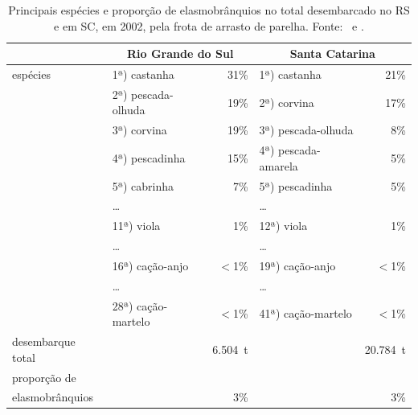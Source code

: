 \documentclass[a4paper,11pt,twoside,showtrims,onecolumn,openright,final]{memoir}
\begin{document}
\begin{table}
\caption[Principais espécies e proporção de elasmobrânquios no total desembarcado no RS e em SC, em 2002,
	 pela frota de arrasto de parelha.]
	{Principais espécies e proporção de elasmobrânquios no total desembarcado no RS e em SC, em 2002,
	 pela frota de arrasto de parelha. Fonte: \citet{ceperg2003}\ e \citet{univali2003}.}
\label{tab:capturas-arrastoparelha}
\begin{center}
\begin{tabular*}{\textwidth}{l@{\extracolsep{\fill}}lrlr}
\toprule
		& \multicolumn{2}{c}{Rio Grande do Sul} & \multicolumn{2}{c}{Santa Catarina} \\
\midrule
espécies 	& 1ª) castanha		& 31\%	& 1ª) castanha		  & 21\%	\\
		& 2ª) pescada-olhuda	& 19\%	& 2ª) corvina 		  & 17\%	\\
		& 3ª) corvina		& 19\%	& 3ª) pescada-olhuda	  & 8\%		\\
		& 4ª) pescadinha	& 15\%	& 4ª) pescada-amarela	  & 5\%		\\
		& 5ª) cabrinha		& 7\%	& 5ª) pescadinha 	  & 5\%		\\
		& \ldots 		&	& \ldots 		  &		\\
		& 11ª) viola		& 1\%	& 12ª) viola	  	  & 1\%		\\
		& \ldots 		&	& \ldots 		  &		\\
		& 16ª) cação-anjo	& $<$1\%& 19ª) cação-anjo  	  & $<$1\%	\\
		& \ldots 		&	& \ldots 		  &		\\
		& 28ª) cação-martelo	& $<$1\%& 41ª) cação-martelo  	  & $<$1\%	\\
\midrule
desembarque total & 			& 6.504~t& 			  & 20.784~t	\\
\midrule
proporção de	& 			&	& 			  & 		\\
elasmobrânquios	& 			& 3\%	& 			  & 3\%		\\
\bottomrule
\end{tabular*}
\end{center}
\end{table}


\end{document}
